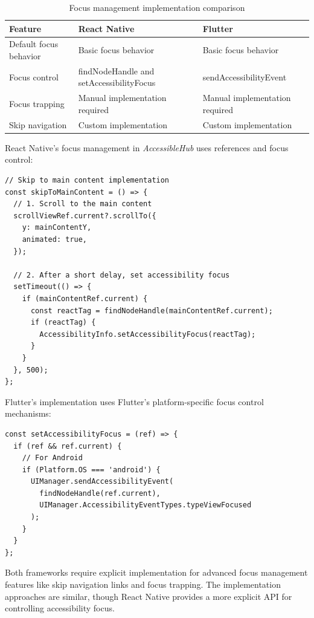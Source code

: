 \begin{table}[ht]
\caption{Focus management implementation comparison}
\label{tab:focus_comparison}
\centering
\begin{tabular}{|p{4cm}|p{5.5cm}|p{5.5cm}|}
\hline
\textbf{Feature} & \textbf{React Native} & \textbf{Flutter} \\
\hline
Default focus behavior & Basic focus behavior & Basic focus behavior \\
\hline
Focus control & findNodeHandle and setAccessibilityFocus & sendAccessibilityEvent \\
\hline
Focus trapping & Manual implementation required & Manual implementation required \\
\hline
Skip navigation & Custom implementation & Custom implementation \\
\hline
\end{tabular}
\end{table}

React Native's focus management in \textit{AccessibleHub} uses references and focus control:

\begin{lstlisting}[style=ReactNativeStyle, caption=React Native focus management implementation, label=lst:rn-focus]
// Skip to main content implementation
const skipToMainContent = () => {
  // 1. Scroll to the main content
  scrollViewRef.current?.scrollTo({
    y: mainContentY,
    animated: true,
  });

  // 2. After a short delay, set accessibility focus
  setTimeout(() => {
    if (mainContentRef.current) {
      const reactTag = findNodeHandle(mainContentRef.current);
      if (reactTag) {
        AccessibilityInfo.setAccessibilityFocus(reactTag);
      }
    }
  }, 500);
};
\end{lstlisting}

Flutter's implementation uses Flutter's platform-specific focus control mechanisms:

\begin{lstlisting}[style=DartStyle, caption=Flutter focus management implementation, label=lst:flutter-focus]
const setAccessibilityFocus = (ref) => {
  if (ref && ref.current) {
    // For Android
    if (Platform.OS === 'android') {
      UIManager.sendAccessibilityEvent(
        findNodeHandle(ref.current),
        UIManager.AccessibilityEventTypes.typeViewFocused
      );
    }
  }
};
\end{lstlisting}

Both frameworks require explicit implementation for advanced focus management features like skip navigation links and focus trapping. The implementation approaches are similar, though React Native provides a more explicit API for controlling accessibility focus.

